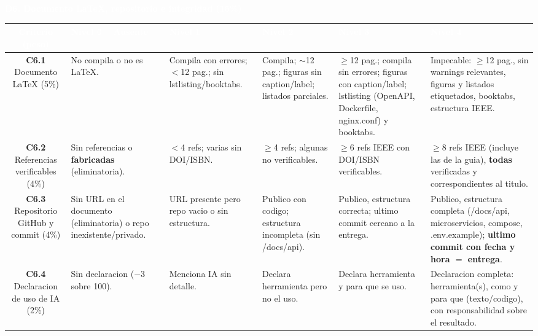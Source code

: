 \documentclass[10pt]{article}
\newcommand{\cab}[1]{\textcolor{white}{\textbf{#1}}}
\newcommand{\dimtitulo}[1]{%
\vspace{4pt}\begin{tcolorbox}[colback=azulMedio,colframe=azulMedio,boxrule=0pt,arc=1pt,left=6pt,right=6pt,top=3pt,bottom=3pt]
\textcolor{white}{\textbf{#1}}\end{tcolorbox}\vspace{-2pt}}
\begin{document}
\dimtitulo{D6. Documento LaTeX, repositorio e integridad (15\%)}
\noindent\begin{tabularx}{\textwidth}{C *{5}{Y}}
\toprule
{} \cab{Criterio (peso)} & \cab{Nivel 0 -- Ausente} & \cab{Nivel 1} & \cab{Nivel 2} & \cab{Nivel 3} & \cab{Nivel 4} \\ \midrule
\textbf{C6.1} Documento LaTeX (5\%) & No compila o no es LaTeX. & Compila con errores; $<$12 pag.; sin lstlisting/booktabs. & Compila; $\sim$12 pag.; figuras sin caption/label; listados parciales. & $\geq$12 pag.; compila sin errores; figuras con caption/label; lstlisting (OpenAPI, Dockerfile, nginx.conf) y booktabs. & Impecable: $\geq$12 pag., sin warnings relevantes, figuras y listados etiquetados, booktabs, estructura IEEE. \\
\textbf{C6.2} Referencias verificables (4\%) & Sin referencias o \textbf{fabricadas} (eliminatoria). & $<$4 refs; varias sin DOI/ISBN. & $\geq$4 refs; algunas no verificables. & $\geq$6 refs IEEE con DOI/ISBN verificables. & $\geq$8 refs IEEE (incluye las de la guia), \textbf{todas} verificadas y correspondientes al titulo. \\
\textbf{C6.3} Repositorio GitHub y commit (4\%) & Sin URL en el documento (eliminatoria) o repo inexistente/privado. & URL presente pero repo vacio o sin estructura. & Publico con codigo; estructura incompleta (sin /docs/api). & Publico, estructura correcta; ultimo commit cercano a la entrega. & Publico, estructura completa (/docs/api, microservicios, compose, .env.example); \textbf{ultimo commit con fecha y hora $=$ entrega}. \\
\textbf{C6.4} Declaracion de uso de IA (2\%) & Sin declaracion ($-3$ sobre 100). & Menciona IA sin detalle. & Declara herramienta pero no el uso. & Declara herramienta y para que se uso. & Declaracion completa: herramienta(s), como y para que (texto/codigo), con responsabilidad sobre el resultado. \\
\bottomrule
\end{tabularx}
\end{document}
